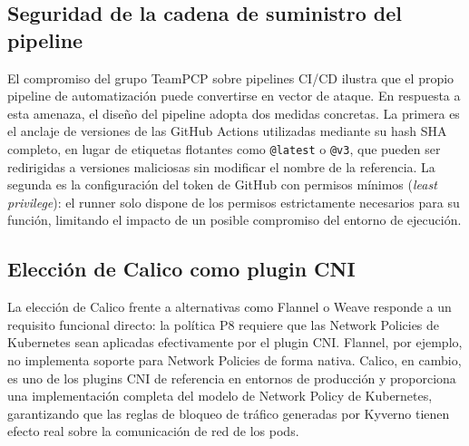 \subsection{Seguridad de la cadena de suministro del pipeline}

El compromiso del grupo TeamPCP sobre pipelines CI/CD \cite{teampcp2026} ilustra que el propio pipeline de automatización puede convertirse en vector de ataque. En respuesta a esta amenaza, el diseño del pipeline adopta dos medidas concretas. La primera es el anclaje de versiones de las GitHub Actions utilizadas mediante su hash SHA completo, en lugar de etiquetas flotantes como \texttt{@latest} o \texttt{@v3}, que pueden ser redirigidas a versiones maliciosas sin modificar el nombre de la referencia. La segunda es la configuración del token de GitHub con permisos mínimos (\textit{least privilege}): el runner solo dispone de los permisos estrictamente necesarios para su función, limitando el impacto de un posible compromiso del entorno de ejecución.

\subsection{Elección de Calico como plugin CNI}

La elección de Calico \cite{calico_docs} frente a alternativas como Flannel o Weave responde a un requisito funcional directo: la política P8 requiere que las Network Policies de Kubernetes sean aplicadas efectivamente por el plugin CNI. Flannel, por ejemplo, no implementa soporte para Network Policies de forma nativa. Calico, en cambio, es uno de los plugins CNI de referencia en entornos de producción y proporciona una implementación completa del modelo de Network Policy de Kubernetes, garantizando que las reglas de bloqueo de tráfico generadas por Kyverno tienen efecto real sobre la comunicación de red de los pods.


